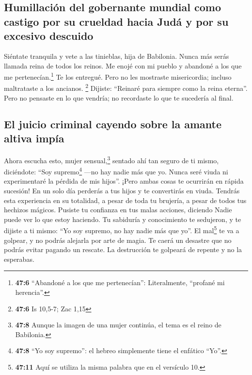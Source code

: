 \hypertarget{humillaciuxf3n-del-gobernante-mundial-como-castigo-por-su-crueldad-hacia-juduxe1-y-por-su-excesivo-descuido}{%
\subsection{Humillación del gobernante mundial como castigo por su
crueldad hacia Judá y por su excesivo
descuido}\label{humillaciuxf3n-del-gobernante-mundial-como-castigo-por-su-crueldad-hacia-juduxe1-y-por-su-excesivo-descuido}}

 Siéntate tranquila y vete a las tinieblas, hija de
Babilonia. Nunca más serás llamada reina de todos los reinos.
 Me enojé con mi pueblo y abandoné a los que me
pertenecían.\footnote{\textbf{47:6} ``Abandoné a los que me
  pertenecían'': Literalmente, ``profané mi herencia''.} Te los
entregué. Pero no les mostraste misericordia; incluso maltrataste a los
ancianos. \footnote{\textbf{47:6} Is 10,5-7; Zac 1,15} 
Dijiste: ``Reinaré para siempre como la reina eterna''. Pero no pensaste
en lo que vendría; no recordaste lo que te sucedería al final.

\hypertarget{el-juicio-criminal-cayendo-sobre-la-amante-altiva-impuxeda}{%
\subsection{El juicio criminal cayendo sobre la amante altiva
impía}\label{el-juicio-criminal-cayendo-sobre-la-amante-altiva-impuxeda}}

 Ahora escucha esto, mujer sensual,\footnote{\textbf{47:8}
  Aunque la imagen de una mujer continúa, el tema es el reino de
  Babilonia.} sentado ahí tan seguro de ti mismo, diciéndote: ``Soy
supremo\footnote{\textbf{47:8} ``Yo soy supremo'': el hebreo simplemente
  tiene el enfático ``Yo''.} ---no hay nadie más que yo. Nunca seré
viuda ni experimentaré la pérdida de mis hijos''.  ¡Pero
ambas cosas te ocurrirán en rápida sucesión! En un solo día perderás a
tus hijos y te convertirás en viuda. Tendrás esta experiencia en su
totalidad, a pesar de toda tu brujería, a pesar de todos tus hechizos
mágicos.  Pusiste tu confianza en tus malas acciones,
diciendo Nadie puede ver lo que estoy haciendo. Tu sabiduría y
conocimiento te sedujeron, y te dijiste a ti mismo: ``Yo soy supremo, no
hay nadie más que yo''.  El mal\footnote{\textbf{47:11}
  Aquí se utiliza la misma palabra que en el versículo 10.} te va a
golpear, y no podrás alejarla por arte de magia. Te caerá un desastre
que no podrás evitar pagando un rescate. La destrucción te golpeará de
repente y no la esperabas.

